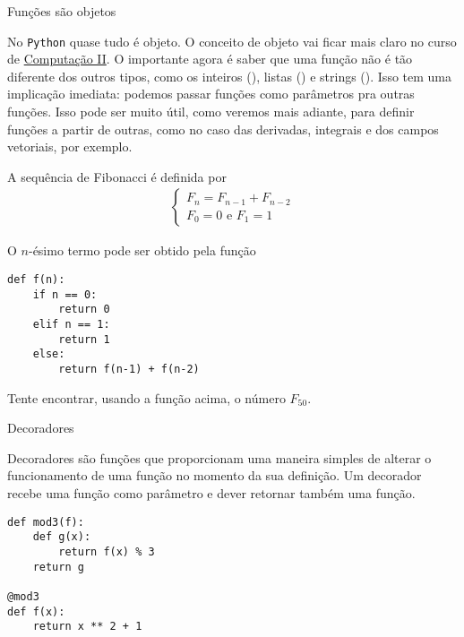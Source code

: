 \documentclass[12pt]{article}
\begin{document}
	
	
	\begin{interlude}{Funções são objetos}
	
	No \texttt{Python} quase tudo é objeto. O conceito de objeto vai ficar mais claro no curso de \href{https://github.com/pedromxavier/monitoria/blob/master/tex/comp2.pdf}{Computação II}. O importante agora é saber que uma função não é tão diferente dos outros tipos, como os inteiros (), listas () e strings (). Isso tem uma implicação imediata: podemos passar funções como parâmetros pra outras funções. Isso pode ser muito útil, como veremos mais adiante, para definir funções a partir de outras, como no caso das derivadas, integrais e dos campos vetoriais, por exemplo.
	
	\end{interlude}	
	
	
	A sequência de Fibonacci é definida por
	\begin{align*}
		\begin{cases}
		F_{n} = F_{n-1} + F_{n-2}\\
		F_{0} = 0 \text{ e } F_{1} = 1
		\end{cases}
	\end{align*}
	
	O $n$-ésimo termo pode ser obtido pela função

	\begin{lstlisting}[caption="Fibonacci"]
def f(n):
	if n == 0:
		return 0
	elif n == 1:
		return 1
	else:
		return f(n-1) + f(n-2)
	\end{lstlisting}
	
	\quest Tente encontrar, usando a função acima, o número $F_{50}$.
	
	\begin{interlude}{Decoradores}\label{i:decoradores}
	
	Decoradores são funções que proporcionam uma maneira simples de alterar o funcionamento de uma função no momento da sua definição. Um decorador recebe uma função como parâmetro e dever retornar também uma função.
	
	\begin{lstlisting}
def mod3(f):
	def g(x):
		return f(x) % 3
	return g
	
@mod3
def f(x):
	return x ** 2 + 1
	\end{lstlisting}	
	
	\end{interlude}
	
\end{document}

